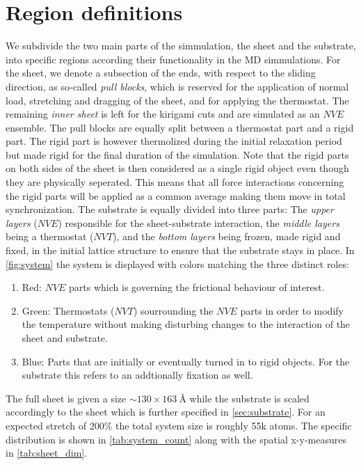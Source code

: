 \section{Region definitions}
We subdivide the two main parts of the simmulation, the sheet and the substrate, into specific regions according their functionality in the \acrshort{MD} simmulations. For the sheet, we denote a subsection of the ends, with respect to the sliding direction, as so-called \textit{pull blocks}, which is reserved for the application of normal load, stretching and
dragging of the sheet, and for applying the thermostat. The remaining \textit{inner
sheet} is left for the kirigami cuts and are simulated as an $NVE$ ensemble. The pull blocks are equally split between a thermostat part and a rigid part. The rigid part is however thermolized during the initial relaxation period but made rigid for the final duration of the simulation. Note that the rigid parts on both sides of the sheet is then considered as a single rigid object even though
they are physically seperated. This means that all force interactions concerning the rigid parts will be applied as a common average making them move in total synchronization. The substrate is equally divided into three parts: The
\textit{upper layers} ($NVE$) responsible for the sheet-substrate interaction, the
\textit{middle layers} being a thermostat ($NVT$), and the \textit{bottom layers} being frozen, made rigid and fixed, in the initial lattice structure to ensure that the substrate stays in place. In \cref{fig:system} the system is displayed
with colors matching the three distinct roles:
\begin{enumerate}
  \item Red: $NVE$ parts which is governing the frictional behaviour of interest.
  \item Green: Thermostats ($NVT$) sourrounding the $NVE$ parts in order to modify the temperature without making disturbing changes to the interaction of the sheet and substrate.
  \item Blue: Parts that are initially or eventually turned in to rigid objects. For the substrate this refers to an addtionally fixation as well.
\end{enumerate}
The full sheet is given a size $\sim 130 \times \SI{163}{\text{Å}}$ while the substrate is scaled accordingly to the sheet which is further specified in \cref{sec:substrate}. For an expected stretch of 200\% the total system size is roughly 55k atoms. The specific distribution is shown in \cref{tab:system_count} along with the spatial x-y-measures in \cref{tab:sheet_dim}.



